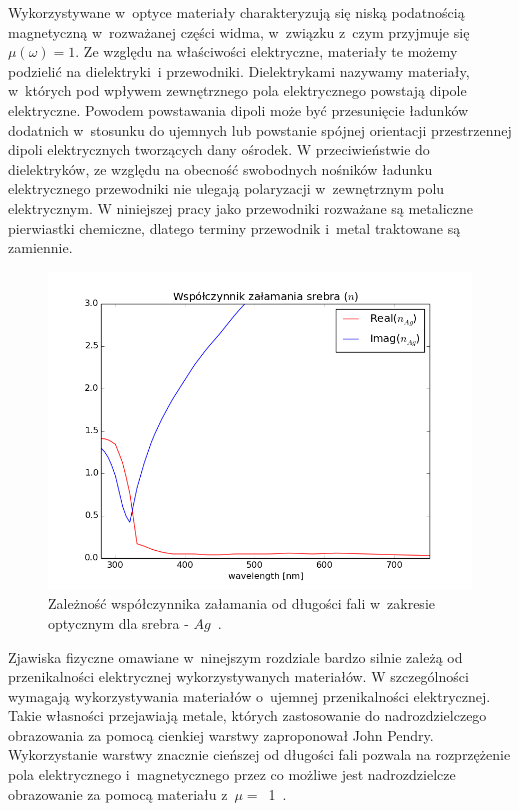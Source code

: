 Wykorzystywane w~optyce materiały charakteryzują się niską podatnością magnetyczną w~rozważanej części widma, w~związku z~czym przyjmuje się ${\mu(\omega)=1}$. Ze względu na właściwości elektryczne, materiały te możemy  podzielić na dielektryki~i przewodniki. Dielektrykami nazywamy materiały, w~których pod wpływem zewnętrznego pola elektrycznego powstają dipole elektryczne. Powodem powstawania dipoli może być przesunięcie ładunków dodatnich w~stosunku do ujemnych lub powstanie spójnej orientacji przestrzennej dipoli elektrycznych tworzących dany ośrodek. W przeciwieństwie do dielektryków, ze względu na obecność swobodnych nośników ładunku elektrycznego przewodniki nie ulegają polaryzacji w~zewnętrznym polu elektrycznym. W niniejszej pracy jako przewodniki rozważane są metaliczne pierwiastki chemiczne, dlatego terminy przewodnik i~metal traktowane są zamiennie.

\begin{figure}[htb]
	\includegraphics[width=\textwidth]{images/agn.png}
	\caption{Zależność współczynnika załamania od długości fali w~zakresie optycznym dla srebra - $Ag$~\cite{PhysRevB.6.4370}.  }
	\label{fig:agn}
\end{figure}
Zjawiska fizyczne omawiane w~ninejszym rozdziale bardzo silnie zależą od przenikalności elektrycznej wykorzystywanych materiałów. W szczególności wymagają wykorzystywania materiałów o~ujemnej przenikalności elektrycznej. Takie własności przejawiają metale, których zastosowanie do nadrozdzielczego obrazowania za pomocą cienkiej warstwy zaproponował John Pendry. Wykorzystanie warstwy znacznie cieńszej od długości fali pozwala na rozprzężenie pola elektrycznego i~magnetycznego przez co możliwe jest nadrozdzielcze obrazowanie za pomocą materiału z~$\mu=$~1~\cite{PhysRevLett.85.3966}.

